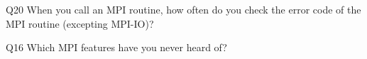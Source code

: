 \begin{description}%
\item{Q20} When you call an MPI routine, how often do you check the error code of the MPI routine  (excepting MPI-IO)?%
\item{Q16} Which MPI features have you never heard of?%
\end{description}%
